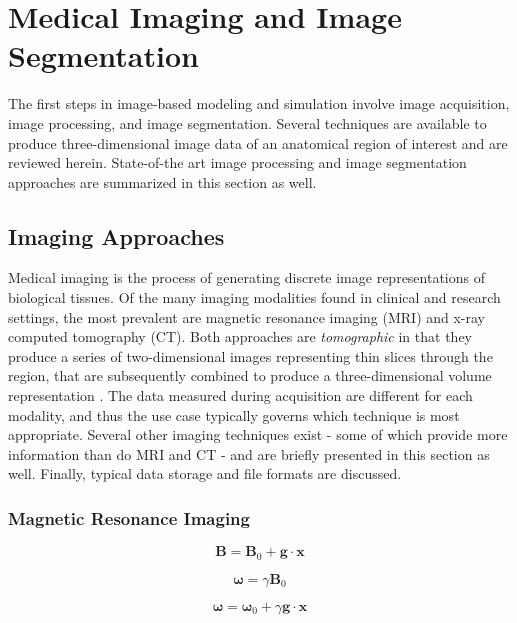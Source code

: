 \chapter{Medical Imaging and Image Segmentation}
%

The first steps in image-based modeling and simulation involve image acquisition, image processing, and image segmentation. Several techniques are available to produce three-dimensional image data of an anatomical region of interest and are reviewed herein. State-of-the art image processing and image segmentation approaches are summarized in this section as well.

\section{Imaging Approaches}
\label{Imaging Approaches}

Medical imaging is the process of generating discrete image representations of biological tissues. Of the many imaging modalities found in clinical and research settings, the most prevalent are magnetic resonance imaging (MRI) and x-ray computed tomography (CT). Both approaches are \textit{tomographic} in that they produce a series of two-dimensional images representing thin slices through the region, that are subsequently combined to produce a three-dimensional volume representation \cite{larobina_murino_2014}. The data measured during acquisition are different for each modality, and thus the use case typically governs which technique is most appropriate. Several other imaging techniques exist - some of which provide more information than do MRI and CT - and are briefly presented in this section as well. Finally, typical data storage and file formats are discussed.

\subsection{Magnetic Resonance Imaging}
\label{Magnetic Resonance Imaging}

\begin{equation}
\bm{B} = \bm{B}_0 + \bm{g} \cdot \bm{x}
\end{equation}

\begin{equation}
\bm{\omega} = \gamma \bm{B}_0
\end{equation}

\begin{equation}
\bm{\omega} = \bm{\omega}_0 + \gamma \bm{g} \cdot \bm{x}
\end{equation}

